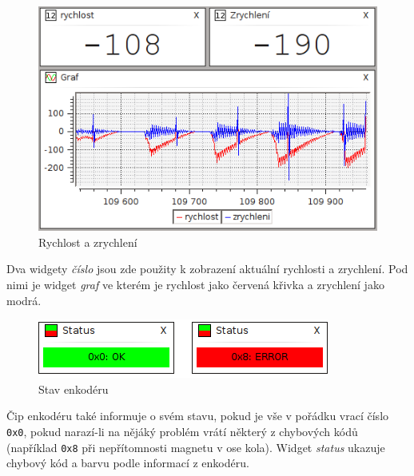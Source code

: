 \documentclass[12pt, a4paper, oneside]{article}
\newcommand{\It}{\textit}  %
\begin{document}
\begin{figure}[H]
\begin{center}
\includegraphics[width=\textwidth-60pt]{img/enc_spd.png}
\caption{Rychlost a zrychlení}
\end{center}
\end{figure}
Dva widgety \It{číslo} jsou zde použity k zobrazení aktuální rychlosti a zrychlení. Pod nimi je widget \It{graf} ve kterém je rychlost jako červená křivka a zrychlení jako modrá.

\begin{figure}[H]
\begin{center}
\includegraphics[width=\textwidth]{img/enc_status.png}
\caption{Stav enkodéru}
\end{center}
\end{figure}
Čip enkodéru také informuje o svém stavu, pokud je vše v pořádku vrací číslo \verb|0x0|, pokud narazí-li na nějáký problém vrátí některý z chybových kódů (například \verb|0x8| při nepřítomnosti magnetu v ose kola). Widget \It{status} ukazuje chybový kód a barvu podle informací z enkodéru.
\end{document}
